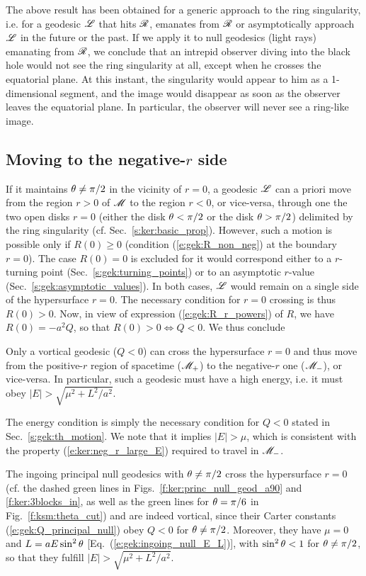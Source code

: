 The above result has been obtained for a generic approach to the ring singularity,
i.e. for a geodesic $\mathscr{L}$ that hits $\mathscr{R}$, emanates from $\mathscr{R}$ or
asymptotically approach $\mathscr{L}$ in the future or the past. If we apply it to
null geodesics (light rays) emanating from $\mathscr{R}$, we conclude that an intrepid observer
diving into the black hole would not see the ring singularity at all, except when
he crosses the equatorial plane. At this instant, the singularity would appear
to him as a 1-dimensional segment, and the image would disappear as soon as the observer
leaves the equatorial plane. In particular, the observer will never see a ring-like image.


\subsection{Moving to the negative-$r$ side}

If it maintains $\theta\neq \pi/2$ in the vicinity of $r=0$, a geodesic $\mathscr{L}$ can a priori
move from the region $r>0$ of $\mathscr{M}$ to the region $r<0$, or vice-versa, through one the
two open disks $r=0$ (either the disk $\theta < \pi/2$ or the disk $\theta>\pi/2$)
delimited by the ring singularity (cf. Sec.~\ref{s:ker:basic_prop}). However,
such a motion is possible only if $R(0) \geq 0$ (condition (\ref{e:gek:R_non_neg}) at the
boundary $r=0$).
The case $R(0) = 0$ is excluded for it would correspond either to a
$r$-turning point (Sec.~\ref{s:gek:turning_points}) or to an asymptotic $r$-value (Sec.~\ref{s:gek:asymptotic_values}). In both cases, $\mathscr{L}$ would remain on a single side of the hypersurface
$r=0$. The necessary condition for $r=0$ crossing is thus $R(0)> 0$. Now, in view of expression (\ref{e:gek:R_r_powers}) of $R$,
we have $R(0) = - a^2 Q$, so that $R(0)> 0 \iff Q < 0$. We thus conclude
\begin{greybox}
Only a vortical geodesic ($Q<0$) can cross the hypersurface $r=0$ and thus move from the positive-$r$ region of spacetime ($\mathscr{M}_+$) to the negative-$r$ one ($\mathscr{M}_-$), or vice-versa. In particular, such a geodesic must have
a high energy, i.e. it must obey $|E| > \sqrt{\mu^2 + L^2/a^2}$.
\end{greybox}
The energy condition is simply the necessary condition for $Q < 0$ stated
in Sec.~\ref{s:gek:th_motion}. We note that it implies $|E| > \mu$, which
is consistent with the property (\ref{e:ker:neg_r_large_E}) required to travel in $\mathscr{M}_-$.

\begin{example}
The ingoing principal null geodesics with $\theta\neq \pi/2$ cross
the hypersurface $r=0$ (cf. the dashed green lines in Figs.~\ref{f:ker:princ_null_geod_a90}
and \ref{f:ker:3blocks_in}, as well as the green lines for $\theta=\pi/6$ in
Fig.~\ref{f:ksm:theta_cut}) and  are indeed vortical,
since their Carter constants (\ref{e:gek:Q_principal_null}) obey $Q<0$ for $\theta\neq \pi/2$.
Moreover, they have $\mu=0$ and $L = a E \sin^2\theta$ [Eq.~(\ref{e:gek:ingoing_null_E_L})],
with $\sin^2\theta < 1$ for $\theta\neq \pi/2$,
so that they fulfill $|E| > \sqrt{\mu^2 + L^2/a^2}$.
\end{example}

